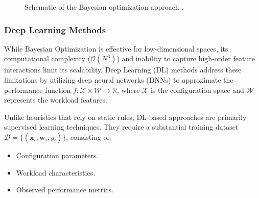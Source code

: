 \begin{figure}[htpb]
    \caption{Schematic of the Bayesian optimization approach \cite{bayesian_process}.}
    \label{fig:bayesian_optimization}
\end{figure}

\subsubsection{Deep Learning Methods}

While Bayesian Optimization is effective for low-dimensional spaces, its computational complexity ($\mathcal{O}(N^3)$) and inability to capture high-order feature interactions limit its scalability.
Deep Learning (DL) methods address these limitations by utilizing deep neural networks (DNNs) to approximate the performance function $f: \mathcal{X} \times \mathcal{W} \to \mathbb{R}$, where $\mathcal{X}$ is the configuration space and $\mathcal{W}$ represents the workload features.

Unlike heuristics that rely on static rules, DL-based approaches are primarily supervised learning techniques.
They require a substantial training dataset $\mathcal{D} = \{(\mathbf{x}_i, \mathbf{w}_i, y_i)\}$, consisting of:
\begin{itemize}
  \item Configuration parameters.
  \item Workload characteristics.
  \item Observed performance metrics.
\end{itemize}


